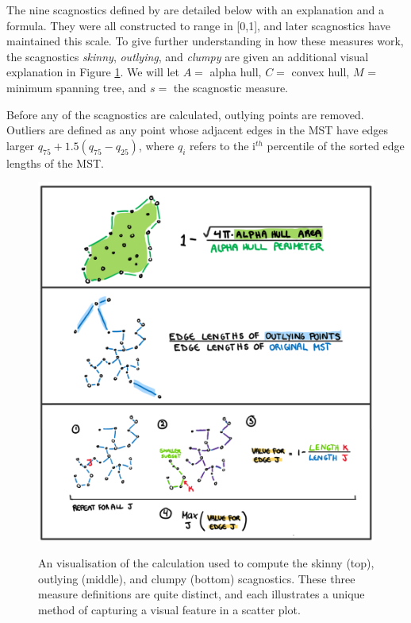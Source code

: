 The nine scagnostics defined by \citet{scagdist} are detailed below with an explanation and a formula. They were all constructed to range in {[}0,1{]}, and later scagnostics have maintained this scale. To give further understanding in how these measures work, the scagnostics \emph{skinny}, \emph{outlying}, and \emph{clumpy} are given an additional visual explanation in Figure \ref{fig:scagdrawn}. We will let \(A=\) alpha hull, \(C=\) convex hull, \(M\) = minimum spanning tree, and \(s=\) the scagnostic measure.

Before any of the scagnostics are calculated, outlying points are removed. Outliers are defined as any point whose adjacent edges in the MST have edges larger \(q_{75} + 1.5(q_{75} - q_{25})\), where \(q_i\) refers to the i\(^{th}\) percentile of the sorted edge lengths of the MST.

\begin{figure}
\includegraphics[width=1\linewidth,alt={A hand drawn illustration showing the algorithm of the skinny, outlying and clumpy calculations. In each drawing the edges used in the calculation are highlighted in both the mathematical formula and in the illustration of the scatter plot.}]{figures/drawnmeasures} \caption{ An visualisation of the calculation used to compute the skinny (top), outlying (middle), and clumpy (bottom) scagnostics. These three measure definitions are quite distinct, and each illustrates a unique method of capturing a visual feature in a scatter plot.}\label{fig:scagdrawn}
\end{figure}

